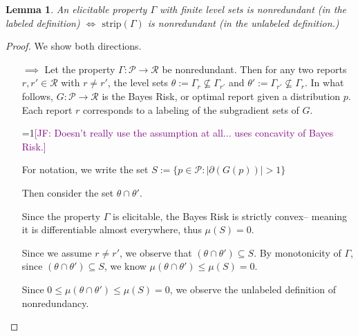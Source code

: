 \documentclass[12pt]{article}
\newcommand{\Comments}{1}
\newcommand{\mynote}[2]{\ifnum\Comments=1\textcolor{#1}{#2}\fi}
\newcommand{\jessie}[1]{\mynote{purple}{[JF: #1]}}
\renewcommand{\P}{\mathcal{P}}
\newcommand{\R}{\mathcal{R}}
\newcommand{\inter}[1]{\mathring{#1}}%
\newcommand{\strip}{\mathrm{strip}}
\newtheorem{lemma}{Lemma}
\begin{document}
\begin{lemma}\label{lem:nonredundant-defs-equivalent}
	An elicitable property $\Gamma$ with finite level sets is nonredundant (in the labeled definition) $\iff$ $\strip(\Gamma)$ is nonredundant (in the unlabeled definition.)
\end{lemma}
\begin{proof}
	We show both directions.\\
	\begin{enumerate}
		\item [$\implies$]
		Let the property $\Gamma:\P \to \R$ be nonredundant.
		Then for any two reports $r, r' \in \R$ with $r \neq r'$, the level sets $\theta := \Gamma_r \not \subseteq \Gamma_{r'}$ and $\theta' := \Gamma_{r'} \not \subseteq \Gamma_r$.
		In what follows, $G : \P \to \R$ is the Bayes Risk, or optimal report given a distribution $p$.
		Each report $r$ corresponds to a labeling of the subgradient sets of $G$.
		
		\jessie{Doesn't really use the assumption at all... uses concavity of Bayes Risk.}
		
		For notation, we write the set $S := \{p \in \P : |\partial(G(p))| > 1\}$
		
		Then consider the set $\theta \cap \theta'$.
		
		
		
		Since the property $\Gamma$ is elicitable, the Bayes Risk is strictly convex-- meaning it is differentiable almost everywhere, thus $\mu(S) = 0$.
		
		Since we assume $r \neq r'$, we observe that $(\theta\cap\theta') \subseteq S$.
		By monotonicity of $\Gamma$, since $(\theta\cap\theta') \subseteq S$, we know $\mu(\theta \cap \theta') \leq \mu(S) = 0$.
		
		
		Since $0 \leq \mu(\theta \cap \theta') \leq \mu(S) = 0$, we observe the unlabeled definition of nonredundancy.
		

\end{enumerate}
\end{proof}
\end{document}
